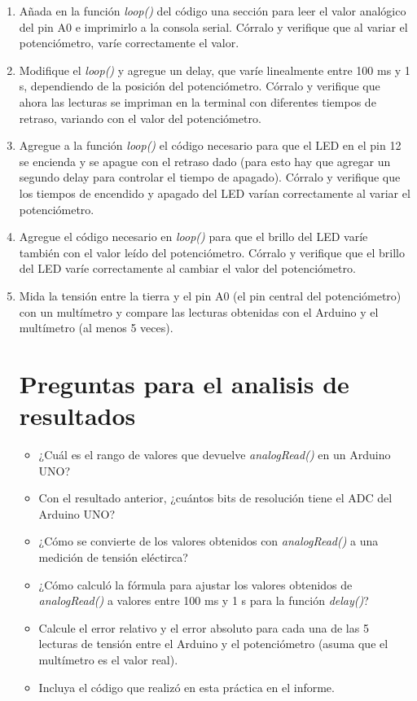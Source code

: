 \begin{enumerate}
    \item Añada en la función \textit{loop()} del código una sección para leer el valor analógico del pin A0 e imprimirlo a la consola serial. Córralo y verifique que al variar el potenciómetro, varíe correctamente el valor.
    \item Modifique el \textit{loop()} y agregue un delay, que varíe linealmente entre 100 ms y 1 s, dependiendo de la posición del potenciómetro. Córralo y verifique que ahora las lecturas se impriman en la terminal con diferentes tiempos de retraso, variando con el valor del potenciómetro.
    \item Agregue a la función \textit{loop()} el código necesario para que el LED en el pin 12 se encienda y se apague con el retraso dado (para esto hay que agregar un segundo delay para controlar el tiempo de apagado). Córralo y verifique que los tiempos de encendido y apagado del LED varían correctamente al variar el potenciómetro.
    \item Agregue el código necesario en \textit{loop()} para que el brillo del LED varíe también con el valor leído del potenciómetro. Córralo y verifique que el brillo del LED varíe correctamente al cambiar el valor del potenciómetro.
    \item Mida la tensión entre la tierra y el pin A0 (el pin central del potenciómetro) con un multímetro y compare las lecturas obtenidas con el Arduino y el multímetro (al menos 5 veces).


    \section{Preguntas para el analisis de resultados}
    \begin{itemize}
        \item ¿Cuál es el rango de valores que devuelve \textit{analogRead()} en un Arduino UNO?
        \item Con el resultado anterior, ¿cuántos bits de resolución tiene el ADC del Arduino UNO?
        \item ¿Cómo se convierte de los valores obtenidos con \textit{analogRead()} a una medición de tensión eléctirca?
        \item ¿Cómo calculó la fórmula para ajustar los valores obtenidos de \textit{analogRead()} a valores entre 100 ms y 1 s para la función \textit{delay()}?
        \item Calcule el error relativo y el error absoluto para cada una de las 5 lecturas de tensión entre el Arduino y el potenciómetro (asuma que el multímetro es el valor real).
        \item Incluya el código que realizó en esta práctica en el informe.
    \end{itemize}
\end{enumerate}
